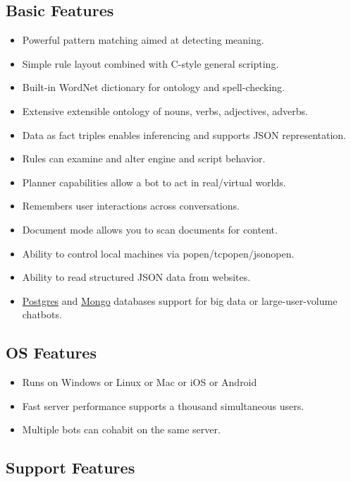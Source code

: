\documentclass[]{article}
\providecommand{\tightlist}{%
  \setlength{\itemsep}{0pt}\setlength{\parskip}{0pt}}
\begin{document}
\subsection{Basic Features}\label{basic-features}

\begin{itemize}
\tightlist
\item
  Powerful pattern matching aimed at detecting meaning.
\item
  Simple rule layout combined with C-style general scripting.
\item
  Built-in WordNet dictionary for ontology and spell-checking.
\item
  Extensive extensible ontology of nouns, verbs, adjectives, adverbs.
\item
  Data as fact triples enables inferencing and supports JSON
  representation.
\item
  Rules can examine and alter engine and script behavior.
\item
  Planner capabilities allow a bot to act in real/virtual worlds.
\item
  Remembers user interactions across conversations.
\item
  Document mode allows you to scan documents for content.
\item
  Ability to control local machines via popen/tcpopen/jsonopen.
\item
  Ability to read structured JSON data from websites.
\item
  \href{https://www.postgresql.org/}{Postgres} and
  \href{https://www.mongodb.com/}{Mongo} databases support for big data
  or large-user-volume chatbots.
\end{itemize}

\subsection{OS Features}\label{os-features}

\begin{itemize}
\tightlist
\item
  Runs on Windows or Linux or Mac or iOS or Android
\item
  Fast server performance supports a thousand simultaneous users.
\item
  Multiple bots can cohabit on the same server.
\end{itemize}

\subsection{Support Features}\label{support-features}
\end{document}
